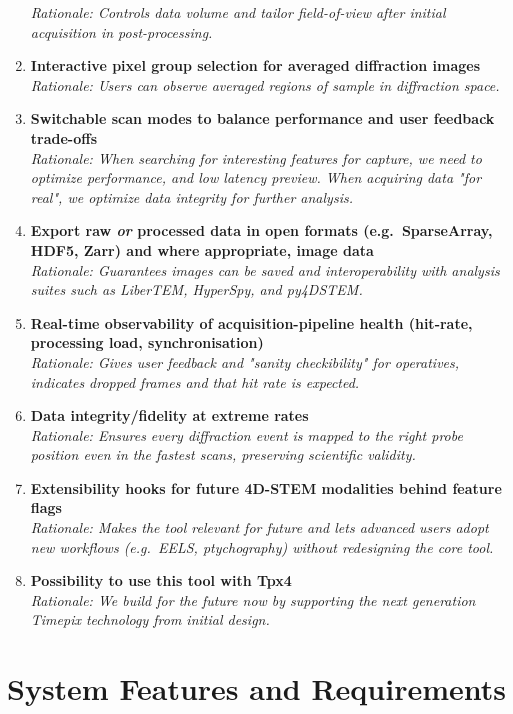 \documentclass[12pt]{article}
\begin{document}
\begin{enumerate}
        \textit{Rationale: Controls data volume and tailor field-of-view after initial acquisition in post-processing.}
  \item \textbf{Interactive pixel group selection for averaged diffraction images}\\
        \textit{Rationale: Users can observe averaged regions of sample in diffraction space.}
  \item \textbf{Switchable scan modes to balance performance and user feedback trade-offs}\\
        \textit{Rationale: When searching for interesting features for capture, we need to optimize performance, and low latency preview. When acquiring data "for real", we optimize data integrity for further analysis.}
  \item \textbf{Export raw \emph{or} processed data in open formats (e.g.\ SparseArray, HDF5, Zarr) and where appropriate, image data}\\
        \textit{Rationale: Guarantees images can be saved and interoperability with analysis suites such as LiberTEM, HyperSpy, and py4DSTEM.}
  \item \textbf{Real-time observability of acquisition-pipeline health (hit-rate, processing load, synchronisation)}\\
        \textit{Rationale: Gives user feedback and "sanity checkibility" for operatives, indicates dropped frames and that hit rate is expected.}
  \item \textbf{Data integrity/fidelity at extreme rates}\\
        \textit{Rationale: Ensures every diffraction event is mapped to the right probe position even in the fastest scans, preserving scientific validity.}
  \item \textbf{Extensibility hooks for future 4D-STEM modalities behind feature flags}\\
        \textit{Rationale: Makes the tool relevant for future and lets advanced users adopt new workflows (e.g.\ EELS, ptychography) without redesigning the core tool.}
  \item \textbf{Possibility to use this tool with Tpx4}\\
    \textit{Rationale: We build for the future now by supporting the next generation Timepix technology from initial design.}
\end{enumerate}


\section{System Features and Requirements}
\end{document}
